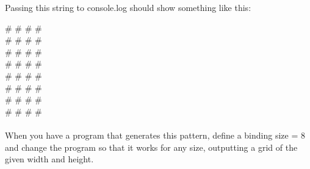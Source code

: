 \documentclass[a4paper]{article}
\begin{document}
Passing this string to console.log should show something like this:

\phantom{  }\# \# \# \#\\
\# \# \# \# \\
\phantom{  }\# \# \# \#\\
\# \# \# \# \\
\phantom{  }\# \# \# \#\\
\# \# \# \# \\
\phantom{  }\# \# \# \#\\
\# \# \# \#\\\\
When you have a program that generates this pattern, define a binding size = 8 and change the program so that it works for any size, outputting a grid of the given width and height.
\end{document}
